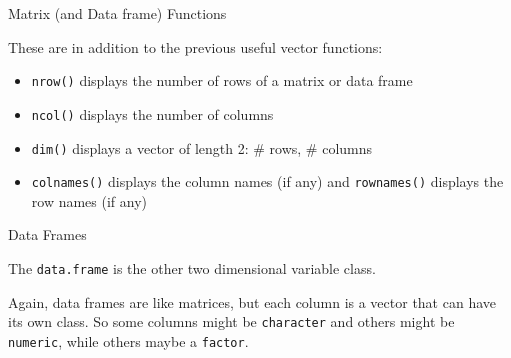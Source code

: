 \documentclass[
  ignorenonframetext,
]{beamer}
\providecommand{\tightlist}{%
  \setlength{\itemsep}{0pt}\setlength{\parskip}{0pt}}
\begin{document}
\begin{frame}[fragile]{Matrix (and Data frame) Functions}
\protect\hypertarget{matrix-and-data-frame-functions}{}

These are in addition to the previous useful vector functions:

\begin{itemize}
\tightlist
\item
  \texttt{nrow()} displays the number of rows of a matrix or data frame
\item
  \texttt{ncol()} displays the number of columns
\item
  \texttt{dim()} displays a vector of length 2: \# rows, \# columns
\item
  \texttt{colnames()} displays the column names (if any) and
  \texttt{rownames()} displays the row names (if any)
\end{itemize}

\end{frame}

\begin{frame}[fragile]{Data Frames}
\protect\hypertarget{data-frames}{}

The \texttt{data.frame} is the other two dimensional variable class.

Again, data frames are like matrices, but each column is a vector that
can have its own class. So some columns might be \texttt{character} and
others might be \texttt{numeric}, while others maybe a \texttt{factor}.

\end{frame}
\end{document}
